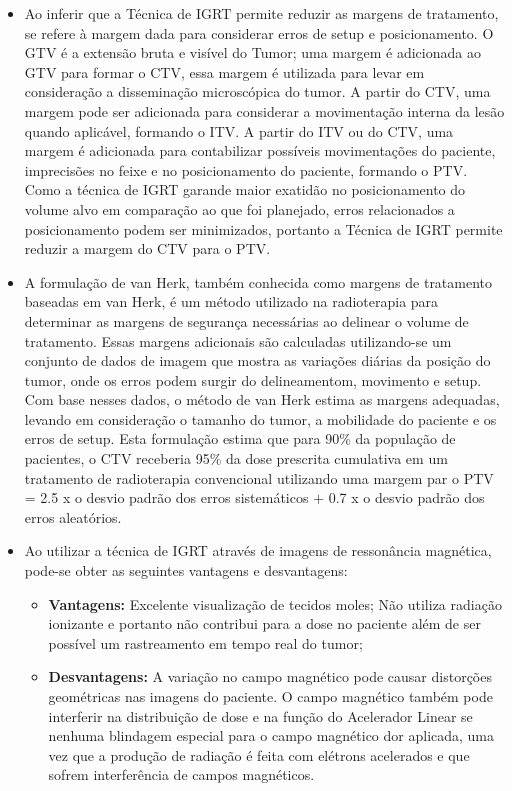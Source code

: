 \documentclass[11pt,a4paper]{article}
\newcounter{exemplo}
\begin{document}
\begin{exemplo}[IGRT]
\begin{itemize}
        \item Ao inferir que a Técnica de IGRT permite reduzir as margens de tratamento, se refere à margem dada para considerar erros de setup e posicionamento. O GTV é a extensão bruta e visível do Tumor; uma margem é adicionada ao GTV para formar o CTV, essa margem é utilizada para levar em consideração a disseminação microscópica do tumor. A partir do CTV, uma margem pode ser adicionada para considerar a movimentação interna da lesão quando aplicável, formando o ITV. A partir do ITV ou do CTV, uma margem é adicionada para contabilizar possíveis movimentações do paciente, imprecisões no feixe e no posicionamento do paciente, formando o PTV. Como a técnica de IGRT garande maior exatidão no posicionamento do volume alvo em comparação ao que foi planejado, erros relacionados a posicionamento podem ser minimizados, portanto a Técnica de IGRT permite reduzir a margem do CTV para o PTV.
        
        \item A formulação de van Herk, também conhecida como margens de tratamento baseadas em van Herk, é um método utilizado na radioterapia para determinar as margens de segurança necessárias ao delinear o volume de tratamento. Essas margens adicionais são calculadas utilizando-se um conjunto de dados de imagem que mostra as variações diárias da posição do tumor, onde os erros podem surgir do delineamentom, movimento e setup. Com base nesses dados, o método de van Herk estima as margens adequadas, levando em consideração o tamanho do tumor, a mobilidade do paciente e os erros de setup. Esta formulação estima que para 90\% da população de pacientes, o CTV receberia 95\% da dose prescrita cumulativa em um tratamento de radioterapia convencional utilizando uma margem par o PTV = 2.5 x o desvio padrão dos erros sistemáticos $+$ 0.7 x o desvio padrão dos erros aleatórios.
        
        \item Ao utilizar a técnica de IGRT através de imagens de ressonância magnética, pode-se obter as seguintes vantagens e desvantagens:
            \begin{itemize}[label=\textcolor{CarnationPink}{$\blacktriangleright$}]
                \item \textbf{Vantagens:} Excelente visualização de tecidos moles; Não utiliza radiação ionizante e portanto não contribui para a dose no paciente além de ser possível um rastreamento em tempo real do tumor;
                \item \textbf{Desvantagens:} A variação no campo magnético pode causar distorções geométricas nas imagens do paciente. O campo magnético também pode interferir na distribuição de dose e na função do Acelerador Linear se nenhuma blindagem especial para o campo magnético dor aplicada, uma vez que a produção de radiação é feita com elétrons acelerados e que sofrem interferência de campos magnéticos.
            \end{itemize}


\end{itemize}
\end{exemplo}
\end{document}
